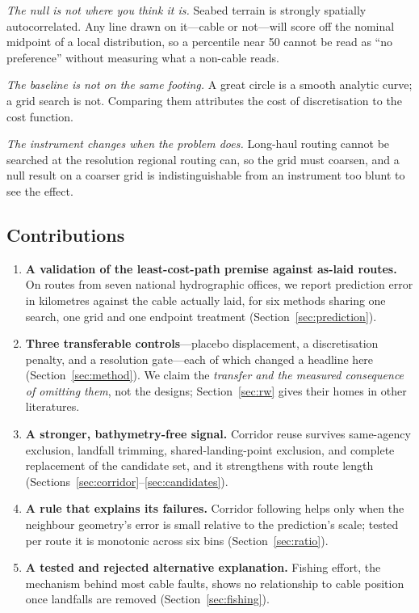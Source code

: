 \documentclass[journal]{IEEEtran}
\begin{document}
\emph{The null is not where you think it is.} Seabed terrain is strongly
spatially autocorrelated. Any line drawn on it---cable or not---will score off
the nominal midpoint of a local distribution, so a percentile near 50 cannot be
read as ``no preference'' without measuring what a non-cable reads.

\emph{The baseline is not on the same footing.} A great circle is a smooth
analytic curve; a grid search is not. Comparing them attributes the cost of
discretisation to the cost function.

\emph{The instrument changes when the problem does.} Long-haul routing cannot
be searched at the resolution regional routing can, so the grid must coarsen,
and a null result on a coarser grid is indistinguishable from an instrument too
blunt to see the effect.

\subsection{Contributions}
\begin{enumerate}
\item \textbf{A validation of the least-cost-path premise against as-laid
routes.} On \nCorpusRoutes{} routes from seven national hydrographic offices,
we report prediction error in kilometres against the cable actually laid, for
six methods sharing one search, one grid and one endpoint treatment
(Section~\ref{sec:prediction}).

\item \textbf{Three transferable controls}---placebo displacement, a
discretisation penalty, and a resolution gate---each of which changed a
headline here (Section~\ref{sec:method}). We claim the \emph{transfer and the
measured consequence of omitting them}, not the designs; Section~\ref{sec:rw}
gives their homes in other literatures.

\item \textbf{A stronger, bathymetry-free signal.} Corridor reuse survives
same-agency exclusion, landfall trimming, shared-landing-point exclusion, and
complete replacement of the candidate set, and it strengthens with route length
(Sections~\ref{sec:corridor}--\ref{sec:candidates}).

\item \textbf{A rule that explains its failures.} Corridor following helps
only when the neighbour geometry's error is small relative to the prediction's
scale; tested per route it is monotonic across six bins
(Section~\ref{sec:ratio}).

\item \textbf{A tested and rejected alternative explanation.} Fishing effort,
the mechanism behind most cable faults, shows no relationship to cable position
once landfalls are removed (Section~\ref{sec:fishing}).
\end{enumerate}
\end{document}

